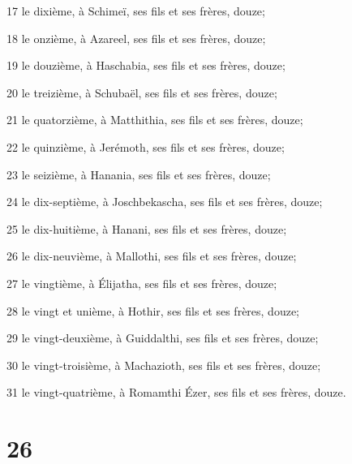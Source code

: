 \par 17 le dixième, à Schimeï, ses fils et ses frères, douze;
\par 18 le onzième, à Azareel, ses fils et ses frères, douze;
\par 19 le douzième, à Haschabia, ses fils et ses frères, douze;
\par 20 le treizième, à Schubaël, ses fils et ses frères, douze;
\par 21 le quatorzième, à Matthithia, ses fils et ses frères, douze;
\par 22 le quinzième, à Jerémoth, ses fils et ses frères, douze;
\par 23 le seizième, à Hanania, ses fils et ses frères, douze;
\par 24 le dix-septième, à Joschbekascha, ses fils et ses frères, douze;
\par 25 le dix-huitième, à Hanani, ses fils et ses frères, douze;
\par 26 le dix-neuvième, à Mallothi, ses fils et ses frères, douze;
\par 27 le vingtième, à Élijatha, ses fils et ses frères, douze;
\par 28 le vingt et unième, à Hothir, ses fils et ses frères, douze;
\par 29 le vingt-deuxième, à Guiddalthi, ses fils et ses frères, douze;
\par 30 le vingt-troisième, à Machazioth, ses fils et ses frères, douze;
\par 31 le vingt-quatrième, à Romamthi Ézer, ses fils et ses frères, douze.

\chapter{26}

